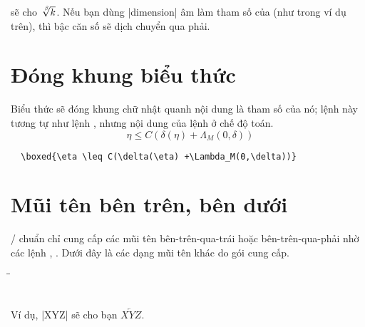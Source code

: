 \documentclass[11pt,leqno,titlepage,openany,oneside]{amsldoc}[1999/12/13]
\begin{document}
\medskip\noindent
sẽ cho $\sqrt[\leftroot{-2}\uproot{2}\beta]{k}$. Nếu bạn dùng |dimension|
âm làm tham số của  (như trong ví dụ trên),
thì bậc căn số sẽ dịch chuyển qua phải.

\section{Đóng khung biểu thức}

Biểu thức  sẽ đóng khung chữ nhật quanh nội dung là tham số của nó;
lệnh này tương tự như lệnh , nhưng nội dung của lệnh ở chế độ toán.
\begin{equation}
\boxed{\eta \leq C(\delta(\eta) +\Lambda_M(0,\delta))}
\end{equation}
\begin{verbatim}
  \boxed{\eta \leq C(\delta(\eta) +\Lambda_M(0,\delta))}
\end{verbatim}

\section{Mũi tên bên trên, bên dưới}

\latex/ chuẩn chỉ cung cấp các mũi tên bên-trên-qua-trái hoặc bên-trên-qua-phải
nhờ các lệnh , . Dưới đây là các dạng
mũi tên khác do gói  cung cấp.

\begin{tabbing}
\qquad\=\qquad\=\kill
\>     \>  \+\\
       \>  \\
   \> 
\end{tabbing}

Ví dụ, |{XYZ}| sẽ cho bạn $\overleftarrow{XYZ}$.
\end{document}
